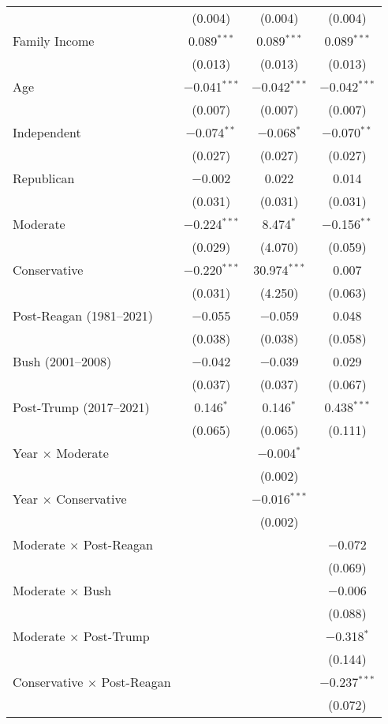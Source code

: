 \begin{ThreePartTable}
\begin{tabularx}{\textwidth}{Xccc}
  & (0.004) & (0.004) & (0.004) \\ 
  Family Income & 0.089$^{***}$ & 0.089$^{***}$ & 0.089$^{***}$ \\ 
  & (0.013) & (0.013) & (0.013) \\ 
  Age & $-$0.041$^{***}$ & $-$0.042$^{***}$ & $-$0.042$^{***}$ \\ 
  & (0.007) & (0.007) & (0.007) \\ 
  Independent & $-$0.074$^{**}$ & $-$0.068$^{*}$ & $-$0.070$^{**}$ \\ 
  & (0.027) & (0.027) & (0.027) \\ 
  Republican & $-$0.002 & 0.022 & 0.014 \\ 
  & (0.031) & (0.031) & (0.031) \\ 
  Moderate & $-$0.224$^{***}$ & 8.474$^{*}$ & $-$0.156$^{**}$ \\ 
  & (0.029) & (4.070) & (0.059) \\ 
  Conservative & $-$0.220$^{***}$ & 30.974$^{***}$ & 0.007 \\ 
  & (0.031) & (4.250) & (0.063) \\ 
  Post-Reagan (1981--2021) & $-$0.055 & $-$0.059 & 0.048 \\ 
  & (0.038) & (0.038) & (0.058) \\ 
  Bush (2001--2008) & $-$0.042 & $-$0.039 & 0.029 \\ 
  & (0.037) & (0.037) & (0.067) \\ 
  Post-Trump (2017--2021) & 0.146$^{*}$ & 0.146$^{*}$ & 0.438$^{***}$ \\ 
  & (0.065) & (0.065) & (0.111) \\ 
  Year $\times$ Moderate &  & $-$0.004$^{*}$ &  \\ 
  &  & (0.002) &  \\ 
  Year $\times$ Conservative &  & $-$0.016$^{***}$ &  \\ 
  &  & (0.002) &  \\ 
  Moderate $\times$ Post-Reagan &  &  & $-$0.072 \\ 
  &  &  & (0.069) \\ 
  Moderate $\times$ Bush &  &  & $-$0.006 \\ 
  &  &  & (0.088) \\ 
  Moderate $\times$ Post-Trump &  &  & $-$0.318$^{*}$ \\ 
  &  &  & (0.144) \\ 
  Conservative $\times$ Post-Reagan &  &  & $-$0.237$^{***}$ \\ 
  &  &  & (0.072) \\ 

\end{tabularx}
\end{ThreePartTable}
